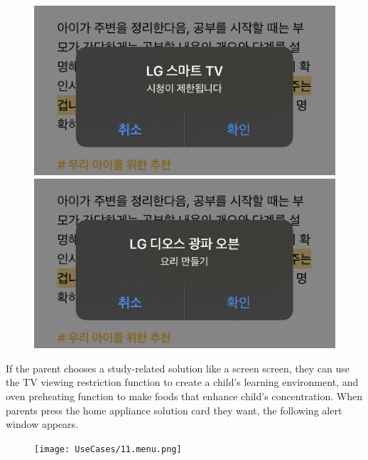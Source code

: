 \documentclass[conference]{IEEEtran}
\begin{document}
\begin{enumerate}
\begin{enumerate}
        \begin{figure}[H]
        \centering
        \includegraphics[scale=0.13]{UseCases/10.lgtvClick.png}
        \includegraphics[scale=0.13]{UseCases/10.lgovenClick.png}
        \end{figure}
        If the parent chooses a study-related solution like a screen screen, they can use the TV viewing restriction function to create a child's learning environment, and oven preheating function to make foods that enhance child’s concentration. When parents press the home appliance solution card they want, the following alert window appears.
        \begin{figure}[H]
        \centering
        \texttt{[image: UseCases/11.menu.png]}

\end{figure}
\end{enumerate}
\end{enumerate}
\end{document}
